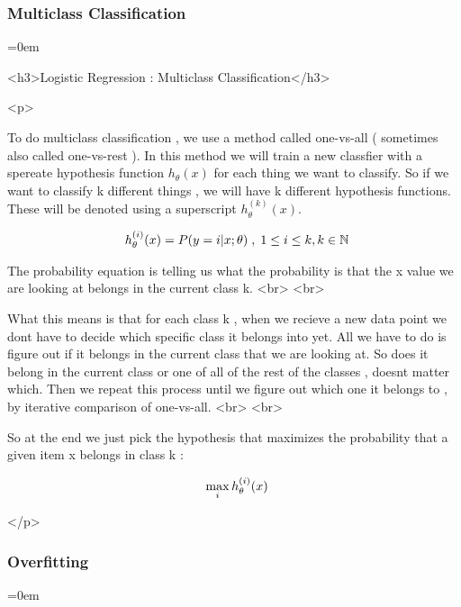 \subsubsectionend
\subsubsection{Multiclass Classification}
\label{sssec:multiclass_classification}
\parindent=0em

	<h3>Logistic Regression : Multiclass Classification</h3>

	<p>

		To do multiclass classification , we use a method called one-vs-all (
		sometimes also called one-vs-rest ). In this method we will train a new
		classfier with a spereate hypothesis function $h_\theta(x)$ for each
		thing we want to classify.  So if we want to classify k different things
		, we will have k different hypothesis functions. These will be denoted
		using a superscript $h_\theta^{(k)}(x)$.
		
		
		\[
			\begin{array}{ l@{} l@{} }
				h_\theta^{(i)}(x) = P(y=i|x;\theta) \; , \; 1 \leq i \leq k , k
				\in \mathbb{N}
			\end{array}
		\]


		The probability equation is telling us what the probability is that the
		x value we are looking at belongs in the current class k. <br> <br>

		What this means is that for each class k , when we recieve a new data
		point we dont have to decide which specific class it belongs into yet.
		All we have to do is figure out if it belongs in the current class that
		we are looking at. So does it belong in the current class or one of all
		of the rest of the classes , doesnt matter which. Then we repeat this
		process until we figure out which one it belongs to , by iterative
		comparison of one-vs-all.  <br> <br>

		So at the end we just pick the hypothesis that maximizes the probability
		that a given item x belongs in class k : 
		
		\[
			\begin{array}{ l@{} l@{} }
				\max\limits_i h_\theta^{(i)}(x) &
			\end{array}
		\]

	</p>


\subsubsectionend
\subsubsection{Overfitting}
\label{sssec:overfitting}
\parindent=0em

